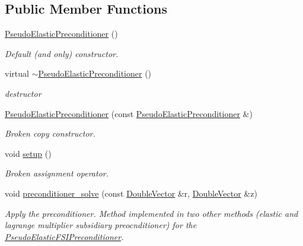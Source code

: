 \subsection*{Public Member Functions}
\begin{DoxyCompactItemize}
\item 
\hyperlink{classoomph_1_1PseudoElasticPreconditioner_ab2638e8ccceed850b8eb581fc1309ff0}{Pseudo\+Elastic\+Preconditioner} ()
\begin{DoxyCompactList}\small\item\em Default (and only) constructor. \end{DoxyCompactList}\item 
virtual \hyperlink{classoomph_1_1PseudoElasticPreconditioner_a9366f2553545b09995e40ad8fa4ed91c}{$\sim$\+Pseudo\+Elastic\+Preconditioner} ()
\begin{DoxyCompactList}\small\item\em destructor \end{DoxyCompactList}\item 
\hyperlink{classoomph_1_1PseudoElasticPreconditioner_aaf160121defa770605f1510e222b14bb}{Pseudo\+Elastic\+Preconditioner} (const \hyperlink{classoomph_1_1PseudoElasticPreconditioner}{Pseudo\+Elastic\+Preconditioner} \&)
\begin{DoxyCompactList}\small\item\em Broken copy constructor. \end{DoxyCompactList}\item 
void \hyperlink{classoomph_1_1PseudoElasticPreconditioner_a69909eef3e1530ca7faf48c653ec7327}{setup} ()
\begin{DoxyCompactList}\small\item\em Broken assignment operator. \end{DoxyCompactList}\item 
void \hyperlink{classoomph_1_1PseudoElasticPreconditioner_a2533d2574d2c7d6613fda72b96a5f885}{preconditioner\+\_\+solve} (const \hyperlink{classoomph_1_1DoubleVector}{Double\+Vector} \&r, \hyperlink{classoomph_1_1DoubleVector}{Double\+Vector} \&z)
\begin{DoxyCompactList}\small\item\em Apply the preconditioner. Method implemented in two other methods (elastic and lagrange multiplier subsidiary preocnditioner) for the \hyperlink{classoomph_1_1PseudoElasticFSIPreconditioner}{Pseudo\+Elastic\+F\+S\+I\+Preconditioner}. \end{DoxyCompactList}\item 

\end{DoxyCompactItemize}
